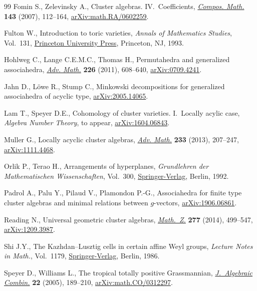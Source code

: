 \documentclass[10pt,a4paper]{amsart}
\numberwithin{equation}{section}
\begin{document}
\begin{thebibliography}{99}
Fomin S., Zelevinsky A., Cluster algebras. {IV}.~{C}oefficients,
 \href{https://doi.org/10.1112/S0010437X06002521}{\textit{Compos. Math.}} \textbf{143} (2007), 112--164,
 \href{https://arxiv.org/abs/math.RA/0602259}{arXiv:math.RA/0602259}.

Fulton W., Introduction to toric varieties, \textit{Annals of Mathematics
 Studies}, Vol.~131, \href{https://doi.org/10.1515/9781400882526}{Princeton University Press}, Princeton, NJ, 1993.

Hohlweg C., Lange C.E.M.C., Thomas H., Permutahedra and generalized
 associahedra, \href{https://doi.org/10.1016/j.aim.2010.07.005}{\textit{Adv. Math.}} \textbf{226} (2011), 608--640,
 \href{https://arxiv.org/abs/0709.4241}{arXiv:0709.4241}.

Jahn D., L\"owe R., Stump C., Minkowski decompositions for generalized
 associahedra of acyclic type, \href{https://arxiv.org/abs/2005.14065}{arXiv:2005.14065}.

Lam T., Speyer D.E., Cohomology of cluster varieties. {I}.~{L}ocally acylic
 case, \textit{Algebra Number Theory}, {t}o appear, \href{https://arxiv.org/abs/1604.06843}{arXiv:1604.06843}.

Muller G., Locally acyclic cluster algebras, \href{https://doi.org/10.1016/j.aim.2012.10.002}{\textit{Adv. Math.}} \textbf{233}
 (2013), 207--247, \href{https://arxiv.org/abs/1111.4468}{arXiv:1111.4468}.

Orlik P., Terao H., Arrangements of hyperplanes, \textit{Grundlehren der
 Mathematischen Wissenschaften}, Vol.~300, \href{https://doi.org/10.1007/978-3-662-02772-1}{Springer-Verlag}, Berlin, 1992.

Padrol A., Palu Y., Pilaud V., Plamondon P.-G., Associahedra for finite type
 cluster algebras and minimal relations between $g$-vectors,
 \href{https://arxiv.org/abs/1906.06861}{arXiv:1906.06861}.

Reading N., Universal geometric cluster algebras, \href{https://doi.org/10.1007/s00209-013-1264-4}{\textit{Math.~Z.}}
 \textbf{277} (2014), 499--547, \href{https://arxiv.org/abs/1209.3987}{arXiv:1209.3987}.

Shi J.Y., The {K}azhdan--{L}usztig cells in certain affine {W}eyl groups,
 \textit{Lecture Notes in Math.}, Vol.~1179, \href{https://doi.org/10.1007/BFb0074968}{Springer-Verlag}, Berlin, 1986.

Speyer D., Williams L., The tropical totally positive {G}rassmannian,
 \href{https://doi.org/10.1007/s10801-005-2513-3}{\textit{J.~Algebraic Combin.}} \textbf{22} (2005), 189--210,
 \href{https://arxiv.org/abs/math.CO/0312297}{arXiv:math.CO/0312297}.


\end{thebibliography}
\end{document}
